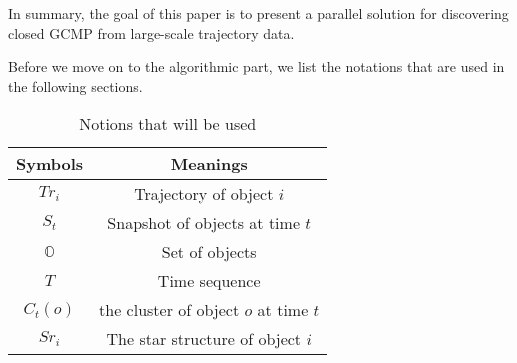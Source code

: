 In summary, the goal of this paper is to present a parallel solution for discovering closed GCMP from large-scale trajectory data.

Before we move on to the algorithmic part, we list the notations that are used in the following sections.

\begin{table}[h]
\centering
\begin{tabular}{|c|c|} 
\hline
Symbols & Meanings \\
\hline 
$Tr_i$ & Trajectory of object $i$\\ 
\hline
$S_t$ & Snapshot of objects at time $t$ \\
\hline 
$\mathbb{O}$ & Set of objects \\ 
\hline 
$T$ & Time sequence \\
\hline
$C_t(o)$ & the cluster of object $o$ at time $t$ \\
\hline 
$Sr_i $ &  The star structure of object $i$ \\
\hline 
\end{tabular} 
\caption{Notions that will be used}
\end{table}